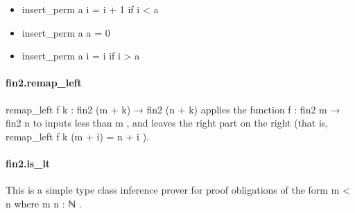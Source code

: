 \documentclass{article}
\begin{document}
\begin{itemize}\item \colorbox[RGB]{253,246,227}{{{{\color[RGB]{101, 123, 131} insert\_perm a i  }}}{{{\color[RGB]{181, 137, 0} = }}}{{{\color[RGB]{101, 123, 131}  i }}}{{{\color[RGB]{181, 137, 0} + }}}{{{\color[RGB]{108, 113, 196} 1 }}}} if 
\colorbox[RGB]{253,246,227}{{{{\color[RGB]{101, 123, 131} i  }}}{{{\color[RGB]{181, 137, 0} < }}}{{{\color[RGB]{101, 123, 131}  a }}}}
\item \colorbox[RGB]{253,246,227}{{{{\color[RGB]{101, 123, 131} insert\_perm a a  }}}{{{\color[RGB]{181, 137, 0} = }}}{{{\color[RGB]{101, 123, 131}   }}}{{{\color[RGB]{108, 113, 196} 0 }}}}
\item \colorbox[RGB]{253,246,227}{{{{\color[RGB]{101, 123, 131} insert\_perm a i  }}}{{{\color[RGB]{181, 137, 0} = }}}{{{\color[RGB]{101, 123, 131}  i }}}} if 
\colorbox[RGB]{253,246,227}{{{{\color[RGB]{101, 123, 131} i  }}}{{{\color[RGB]{181, 137, 0} > }}}{{{\color[RGB]{101, 123, 131}  a }}}}
\end{itemize}\paragraph{fin2.remap\_left}
\par
\colorbox[RGB]{253,246,227}{{{{\color[RGB]{101, 123, 131} remap\_left f k : fin2 (m  }}}{{{\color[RGB]{181, 137, 0} + }}}{{{\color[RGB]{101, 123, 131}  k)  }}}{{{\color[RGB]{133, 153, 0} → }}}{{{\color[RGB]{101, 123, 131}  fin2 (n  }}}{{{\color[RGB]{181, 137, 0} + }}}{{{\color[RGB]{101, 123, 131}  k) }}}} applies the function
\colorbox[RGB]{253,246,227}{{{{\color[RGB]{101, 123, 131} f : fin2 m  }}}{{{\color[RGB]{133, 153, 0} → }}}{{{\color[RGB]{101, 123, 131}  fin2 n }}}} to inputs less than 
\colorbox[RGB]{253,246,227}{{{{\color[RGB]{101, 123, 131} m }}}}, and leaves the right part
on the right (that is, 
\colorbox[RGB]{253,246,227}{{{{\color[RGB]{101, 123, 131} remap\_left f k (m  }}}{{{\color[RGB]{181, 137, 0} + }}}{{{\color[RGB]{101, 123, 131}  i)  }}}{{{\color[RGB]{181, 137, 0} = }}}{{{\color[RGB]{101, 123, 131}  n  }}}{{{\color[RGB]{181, 137, 0} + }}}{{{\color[RGB]{101, 123, 131}  i }}}}).
\paragraph{fin2.is\_lt}
\par
This is a simple type class inference prover for proof obligations
of the form 
\colorbox[RGB]{253,246,227}{{{{\color[RGB]{101, 123, 131} m  }}}{{{\color[RGB]{181, 137, 0} < }}}{{{\color[RGB]{101, 123, 131}  n }}}} where 
\colorbox[RGB]{253,246,227}{{{{\color[RGB]{101, 123, 131} m n : ℕ }}}}.
\end{document}
